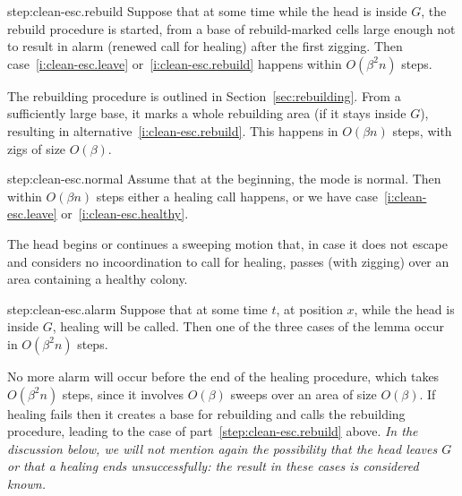 \documentclass[12pt]{memoir}
\def\G{G}
\begin{document}
\begin{Proof}
\begin{step+}{step:clean-esc.rebuild}
Suppose that at some time while the head is inside \( \G \), the rebuild procedure is started,
from a base of rebuild-marked cells large enough not to result in alarm (renewed call for healing)
after the first zigging.
Then case~\eqref{i:clean-esc.leave} or~\eqref{i:clean-esc.rebuild} 
happens within \( O(\beta^{2} n) \) steps.
\end{step+}
\begin{pproof}
The rebuilding procedure is outlined in Section~\ref{sec:rebuilding}.
From a sufficiently large base, it 
marks a whole rebuilding area (if it stays inside \( G \)), resulting
in alternative~\eqref{i:clean-esc.rebuild}.
This happens in \( O(\beta n) \) steps, with zigs of size \( O(\beta) \).  
\end{pproof} %

\begin{step+}{step:clean-esc.normal}
Assume that at the beginning, the mode is normal.
Then within \( O(\beta n) \) steps either a healing call happens, or we have 
case~\eqref{i:clean-esc.leave} or~\eqref{i:clean-esc.healthy}.
\end{step+}
\begin{pproof}
The head begins or continues a sweeping motion that, in case it does not escape
and considers no incoordination to call for healing,
passes (with zigging) over an area containing a healthy colony.
\end{pproof} %

\begin{step+}{step:clean-esc.alarm}
Suppose that at some time \( t \), at position \( x \),
while the head is inside \( \G \), healing will be called.
Then one of the three cases of the lemma occur in \( O(\beta^{2} n) \) steps.
\end{step+}
\begin{pproof}
No more alarm will occur before the end of the healing procedure, which
takes \( O(\beta^{2} n) \) steps,
since it involves \( O(\beta) \) sweeps over an area of size \( O(\beta) \).
If healing fails then it creates a base for rebuilding and calls the rebuilding
procedure, leading to the case of part~\ref{step:clean-esc.rebuild} above.
\emph{In the discussion below, we will not mention again the possibility that the head
leaves \( G \) or that a healing ends unsuccessfully: the result in these cases is considered
known.}


\end{pproof}
\end{Proof}
\end{document}
